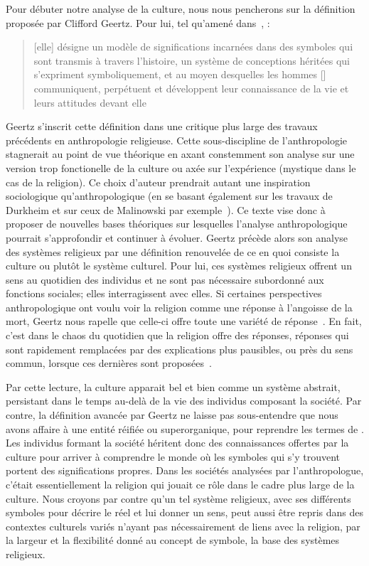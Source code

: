 Pour débuter notre analyse de la culture, nous nous pencherons sur la définition proposée par Clifford Geertz.
Pour lui, tel qu'amené dans~, : \blockquote[{\cite[21]{Geertz1972}}][.]{\textelp{} [elle] désigne un modèle de significations incarnées dans des symboles qui sont transmis à travers l'histoire, un système de conceptions héritées qui s'expriment symboliquement, et au moyen desquelles les hommes [] communiquent, perpétuent et développent leur connaissance de la vie et leurs attitudes devant elle}.
Geertz s'inscrit cette définition dans une critique plus large des travaux précédents en anthropologie religieuse.
Cette sous-discipline de l'anthropologie stagnerait au point de vue théorique en axant constemment son analyse sur une version trop fonctionelle de la culture ou axée sur l'expérience (mystique dans le cas de la religion).
Ce choix d'auteur prendrait autant une inspiration sociologique qu'anthropologique (en se basant également sur les travaux de Durkheim et sur ceux de Malinowski par exemple~\citep[20]{Geertz1972}).
Ce texte vise donc à proposer de nouvelles bases théoriques sur lesquelles l'analyse anthropologique pourrait s'approfondir et continuer à évoluer.
Geertz précède alors son analyse des systèmes religieux par une définition renouvelée de ce en quoi consiste la culture ou plutôt le système culturel.
Pour lui, ces systèmes religieux offrent un sens au quotidien des individus et ne sont pas nécessaire subordonné aux fonctions sociales; elles interragissent avec elles.
Si certaines perspectives anthropologique ont voulu voir la religion comme une réponse à l'angoisse de la mort, Geertz nous rapelle que celle-ci offre toute une variété de réponse~\citep[][37]{Geertz1972}.
En fait, c'est dans le chaos du quotidien que la religion offre des réponses, réponses qui sont rapidement remplacées par des explications plus pausibles, ou près du sens commun, lorsque ces dernières sont proposées~\citep[][39]{Geertz1972}.

Par cette lecture, la culture apparait bel et bien comme un système abstrait, persistant dans le temps au-delà de la vie des individus composant la société.
Par contre, la définition avancée par Geertz ne laisse pas sous-entendre que nous avons affaire à une entité réifiée ou superorganique, pour reprendre les termes de \citet{Duncan1980}.
Les individus formant la société héritent donc des connaissances offertes par la culture pour arriver à comprendre le monde où les symboles qui s'y trouvent portent des significations propres.
Dans les sociétés analysées par l'anthropologue, c'était essentiellement la religion qui jouait ce rôle dans le cadre plus large de la culture.
Nous croyons par contre qu'un tel système religieux, avec ses différents symboles pour décrire le réel et lui donner un sens, peut aussi être repris dans des contextes culturels variés n'ayant pas nécessairement de liens avec la religion, par la largeur et la flexibilité donné au concept de symbole, la base des systèmes religieux.

